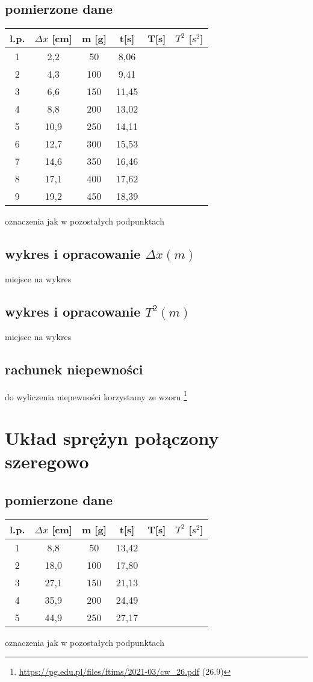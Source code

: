 \documentclass{article}
\begin{document}
\subsection{pomierzone dane}
\begin{center}
\begin{tabular}{ c | c | c | c | c | c }
l.p. & $\Delta x$ [cm] & m [g] & t[s]  & T[s] & $T^2$ [$s^2$]\\
\hline
 1 & 2,2   & 50 & 8,06\\ 
 2 & 4,3   & 100 & 9,41\\ 
 3 & 6,6   & 150 & 11,45\\ 
 4 & 8,8  & 200 & 13,02\\
 5 & 10,9 & 250 & 14,11\\
 6 & 12,7 & 300 & 15,53\\
 7 & 14,6 & 350 & 16,46\\
 8 & 17,1  & 400 & 17,62\\
 9 & 19,2 & 450 & 18,39

\end{tabular}
\end{center}
oznaczenia jak w pozostałych podpunktach

\subsection{wykres i opracowanie $\Delta x(m)$}
miejsce na wykres

\subsection{wykres i opracowanie $T^2(m)$}
miejsce na wykres

\subsection{rachunek niepewności}
do wyliczenia niepewności korzystamy ze wzoru \footnote{\url{https://pg.edu.pl/files/ftims/2021-03/cw_26.pdf} (26.9)}

\section{Układ sprężyn połączony szeregowo}
\subsection{pomierzone dane}
\begin{center}
\begin{tabular}{ c | c | c | c | c | c }
l.p. & $\Delta x$ [cm] & m [g] & t[s]  & T[s] & $T^2$ [$s^2$]\\
\hline
 1 & 8,8   & 50 & 13,42 \\ 
 2 & 18,0   & 100 &17,80\\ 
 3 & 27,1   & 150 & 21,13\\ 
 4 & 35,9  & 200 & 24,49\\
 5 & 44,9 & 250 & 27,17\\


\end{tabular}
\end{center}
oznaczenia jak w pozostałych podpunktach
\end{document}
